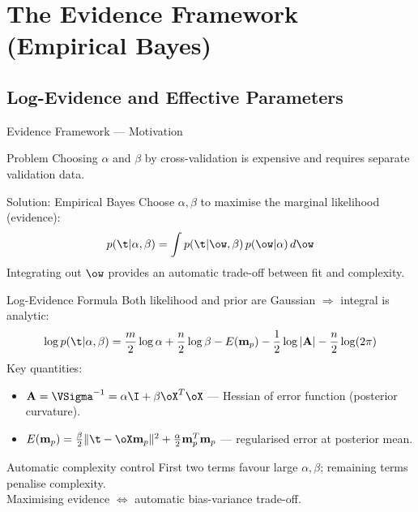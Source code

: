 \section{The Evidence Framework (Empirical Bayes)}

\subsection{Log-Evidence and Effective Parameters}

\begin{frame}{Evidence Framework — Motivation}
  \begin{alertblock}{Problem}
    Choosing $\alpha$ and $\beta$ by cross-validation is expensive and requires separate validation data.
  \end{alertblock}
  \vspace{.3em}
  \begin{block}{Solution: Empirical Bayes}
    Choose $\alpha,\beta$ to maximise the \alert{marginal likelihood} (evidence):
    \[
      p(\t|\alpha,\beta) = \int p(\t|\ow,\beta)\,p(\ow|\alpha)\,d\ow
    \]
    Integrating out $\ow$ provides an \alert{automatic} trade-off between fit and complexity.
  \end{block}
\end{frame}

\begin{frame}{Log-Evidence Formula}
  Both likelihood and prior are Gaussian $\Rightarrow$ integral is analytic:
  \[
    \log p(\t|\alpha,\beta)
    = \frac{m}{2}\log\alpha + \frac{n}{2}\log\beta - E(\mathbf{m}_p)
    - \frac{1}{2}\log|\mathbf{A}| - \frac{n}{2}\log(2\pi)
  \]
  Key quantities:
  \begin{itemize}
    \item $\mathbf{A} = \VSigma^{-1} = \alpha\I + \beta\oX^T\oX$ — Hessian of error function (posterior curvature).
    \item $E(\mathbf{m}_p) = \tfrac{\beta}{2}\|\t-\oX\mathbf{m}_p\|^2 + \tfrac{\alpha}{2}\mathbf{m}_p^T\mathbf{m}_p$ — regularised error at posterior mean.
  \end{itemize}
  \vspace{.2em}
  \begin{exampleblock}{Automatic complexity control}
    First two terms favour large $\alpha,\beta$; remaining terms penalise complexity.\\
    Maximising evidence $\Leftrightarrow$ automatic bias-variance trade-off.
  \end{exampleblock}
\end{frame}

